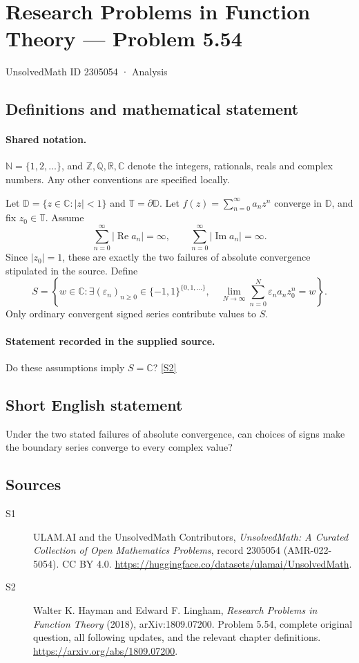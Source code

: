 \documentclass[11pt]{book}
\newcommand{\sref}[2]{\hyperlink{source:#1:#2}{[S#2]}}
\begin{document}
\setcounter{section}{2305053}
\section{Research Problems in Function Theory — Problem 5.54}\label{2305054}
{\small\sffamily UnsolvedMath ID 2305054 · Analysis}
\subsection{Definitions and mathematical statement}

\paragraph{Shared notation.}$\mathbb N=\{1,2,\ldots\}$, and $\mathbb Z,\mathbb Q,\mathbb R,\mathbb C$ denote the integers, rationals, reals and complex numbers. Any other conventions are specified locally.


Let $\mathbb D=\{z\in\mathbb C:|z|<1\}$ and $\mathbb T=\partial\mathbb D$. Let $f(z)=\sum_{n=0}^{\infty}a_nz^n$ converge in $\mathbb D$, and fix $z_0\in\mathbb T$. Assume \[\sum_{n=0}^{\infty}|\operatorname{Re}a_n|=\infty,\qquad\sum_{n=0}^{\infty}|\operatorname{Im}a_n|=\infty.\] Since $|z_0|=1$, these are exactly the two failures of absolute convergence stipulated in the source. Define \[S=\left\{w\in\mathbb C:\exists(\varepsilon_n)_{n\ge0}\in\{-1,1\}^{\{0,1,\ldots\}},\quad\lim_{N\to\infty}\sum_{n=0}^{N}\varepsilon_na_nz_0^n=w\right\}.\] Only ordinary convergent signed series contribute values to $S$.
\paragraph{Statement recorded in the supplied source.}
Do these assumptions imply $S=\mathbb C$? \sref{2305054}{2}
\subsection{Short English statement}
Under the two stated failures of absolute convergence, can choices of signs make the boundary series converge to every complex value?
\subsection{Sources}
\begin{description}
\item[\hypertarget{source:2305054:1}{S1}] ULAM.AI and the UnsolvedMath Contributors, \emph{UnsolvedMath: A Curated Collection of Open Mathematics Problems}, record 2305054 (AMR-022-5054). CC BY 4.0. \url{https://huggingface.co/datasets/ulamai/UnsolvedMath}.
\item[\hypertarget{source:2305054:2}{S2}] Walter K. Hayman and Edward F. Lingham, \emph{Research Problems in Function Theory} (2018), arXiv:1809.07200. Problem 5.54, complete original question, all following updates, and the relevant chapter definitions. \url{https://arxiv.org/abs/1809.07200}.
\end{description}
\label{end:2305054}
\end{document}

